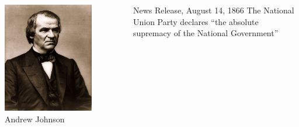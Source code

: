 \begin{frame}
    \begin{columns}[onlytextwidth]
            \centering
            \includegraphics[width=0.75\textwidth]{img/andrew-johnson.jpg} \\
            Andrew Johnson \\

            \begin{block}{News Release, August 14, 1866}
                The National Union Party declares ``the absolute supremacy of the National Government''
            \end{block}
    \end{columns}
\end{frame}


